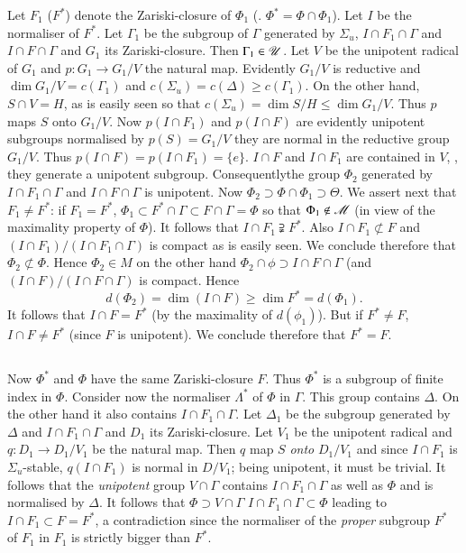 Let $F_1$ (\resp $F^\ast$) denote the Zariski-closure of $\Phi_1$ (\resp. $\Phi^\ast = \Phi \cap \Phi_1$). Let $I$ be the normaliser of $F^\ast$. Let $\Gamma_1$ be the subgroup of $\Gamma$ generated by $\Sigma_u$, $I \cap F_1 \cap \Gamma$ and $I \cap F \cap \Gamma$ and $G_1$ its Zariski-closure. Then $\Gamma_1 \in \mathscr{U}$. Let $V$ be the unipotent radical of $G_1$ and $p: G_1 \to G_1 / V$ the natural map. Evidently $G_1 / V$ is reductive and $\dim G_1/ V = c(\Gamma_1)$ and $c(\Sigma_u) = c (\Delta) \geqslant c(\Gamma_1)$. On the other hand, $S \cap V = H$, as is easily seen so that $c (\Sigma_u) = \dim S/ H \leqslant \dim G_1 / V$. Thus $p$ maps $S$ onto $G_1/V$. Now $p(I \cap F_1)$ and $p(I \cap F)$ are evidently unipotent subgroups normalised by $p(S) = G_1 / V$ \ie they are normal in the reductive group $G_1/ V$. Thus $p(I \cap F) = p (I \cap F_1)=\{e\}$. $I \cap F$ and $I \cap F_1$ are contained in $V$, \ie, they generate a unipotent subgroup. Consequently\pageoriginale the group $\Phi_2$ generated by $I \cap F_1 \cap \Gamma$ and $I \cap F \cap \Gamma$ is unipotent. Now $\Phi_2 \supset \Phi \cap \Phi_1 \supset \Theta$. We assert next that $F_1 \neq F^\ast$: if $F_1 = F^\ast$, $\Phi_1 \subset F^\ast \cap \Gamma \subset F \cap \Gamma = \Phi$ so that $\Phi_1 \not\in \mathscr{M}$ (in view of the maximality property of $\Phi$). It follows that $I \cap F_1 \supsetneqq F^\ast$. Also $I \cap F_1 \not\subset F$ and $(I \cap F_1)/ (I\cap F_1 \cap \Gamma)$ is compact as is easily seen. We conclude therefore that $\Phi_2 \not\subset \Phi$. Hence $\Phi_2 \in M$ on the other hand $\Phi_2 \cap \phi \supset I \cap F \cap \Gamma$ (and $(I \cap F)/ (I \cap F \cap \Gamma)$ is compact. Hence
$$
d (\Phi_2) = \dim (I \cap F) \geqslant \dim F^\ast = d (\Phi_1).
$$
It follows that $I \cap F = F^\ast$ (by the maximality of $d(\phi_1)$). But if $F^\ast \neq F$, $I \cap F \neq F^\ast$ (since $F$ is unipotent). We conclude therefore that $F^\ast = F$.

\setcounter{subsection}{22}
\subsection{}\label{art9-subsec2.23}
Now $\Phi^\ast$ and $\Phi$ have the same Zariski-closure $F$. Thus $\Phi^\ast$ is a subgroup of finite index in $\Phi$. Consider now the normaliser $\Lambda^\ast$ of $\Phi$ in $\Gamma$. This group contains $\Delta$. On the other hand it also contains $I \cap F_1 \cap \Gamma$. Let $\Delta_1$ be the subgroup generated by $\Delta$ and $I \cap F_1 \cap \Gamma$ and $D_1$ its Zariski-closure. Let $V_1$ be the unipotent radical and $q : D_1 \to D_1 / V_1$ be the natural map. Then $q$ map $S$ \textit{ onto } $D_1/ V_1$ and since $I \cap F_1$ is $\Sigma_u$-stable, $q (I \cap F_1)$ is normal in $D/V_1$; being unipotent, it must be trivial. It follows that the \textit{ unipotent } group $V \cap \Gamma$ contains $I \cap F_1 \cap \Gamma$ as well as $\Phi$ and is normalised by $\Delta$. It follows that $\Phi \supset V \cap \Gamma$ \ie $I \cap F_1 \cap \Gamma \subset \Phi$ leading to $I \cap F_1 \subset F = F^\ast$, a contradiction since the normaliser of the \textit{proper} subgroup $F^\ast$ of $F_1$ in $F_1$ is strictly bigger than $F^\ast$.

